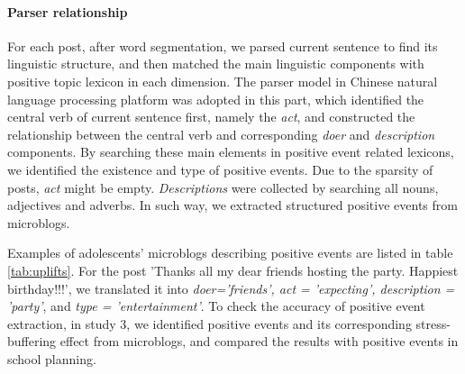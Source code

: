 \paragraph{Parser relationship}
For each post, after word segmentation, we parsed current sentence to find its linguistic structure,
and then matched the main linguistic components with positive topic lexicon in each dimension.
The parser model in Chinese natural language processing platform \citep{Che2010} was adopted in this part,
which identified the central verb of current sentence first, namely the \emph{act},
and constructed the relationship between the central verb and corresponding \emph{doer} and \emph{description} components.
By searching these main elements in positive event related lexicons,
we identified the existence and type of positive events.
Due to the sparsity of posts, \emph{act} might be empty.
\emph{Descriptions} were collected by searching all nouns, adjectives and adverbs.
In such way, we extracted structured positive events from microblogs.

Examples of adolescents' microblogs describing positive events are listed in table \ref{tab:uplifts}.
For the post 'Thanks all my dear friends hosting the party. Happiest birthday!!!',
we translated it into \emph{doer='friends', act = 'expecting', description = 'party'},
and \emph{type = 'entertainment'}.
To check the accuracy of positive event extraction,
in study 3,
we identified positive events and its corresponding stress-buffering effect from microblogs,
and compared the results with positive events in school planning.

